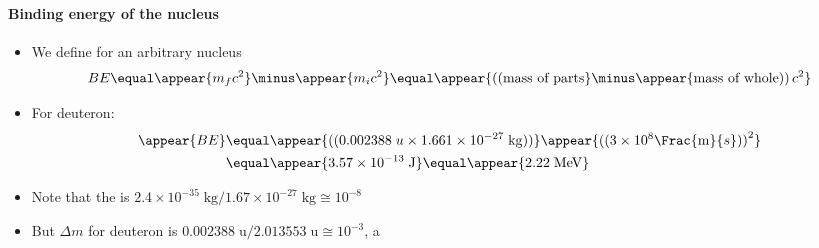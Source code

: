 \begin{frame}
\frametitle{\texorpdfstring{\culine[\sectiontitleulinecolor]{\sectiontitle}}{\sectiontitle} }
\framesubtitle{Binding energy of the nucleus}

\begin{itemize}
	\item We define  for an arbitrary nucleus
\[
BE  \equal \appear{m_{f} c^{2}}  \minus \appear{m_{i} c^{2}}  \equal   \appear{\textrm{((} \text{mass of parts}}  \minus \appear{\text {mass of whole} \textrm{))}\, c^{2}}
\]

\item For deuteron:
$$
\begin{aligned}
\appear{B E} &  \equal  \appear{\textrm{((}  0.002388 \;u \times 1.661 \times 10^{-27} \mathrm{\;kg} \textrm{))} }  \appear{\textrm{((}  3 \times 10^{8} \Frac{\mathrm{m}}{s} \textrm{))}^{2}} \\
&  \equal \appear{3.57 \times 10^{-13} \mathrm{\;J}}  \equal \appear{2.22 \mathrm{\;MeV}}
\end{aligned}
$$
 

\item Note that the  is $2.4 \times 10^{-35} \mathrm{\;kg} / 1.67 \times 10^{-27} \mathrm{\;kg} \cong 10^{-8}$ 
\item But $\Delta m$ for deuteron is $0.002388 \mathrm{\;u} / 2.013553 \mathrm{\;u} \cong 10^{-3}$, a 
\end{itemize}


\endofslide 
\end{frame}

